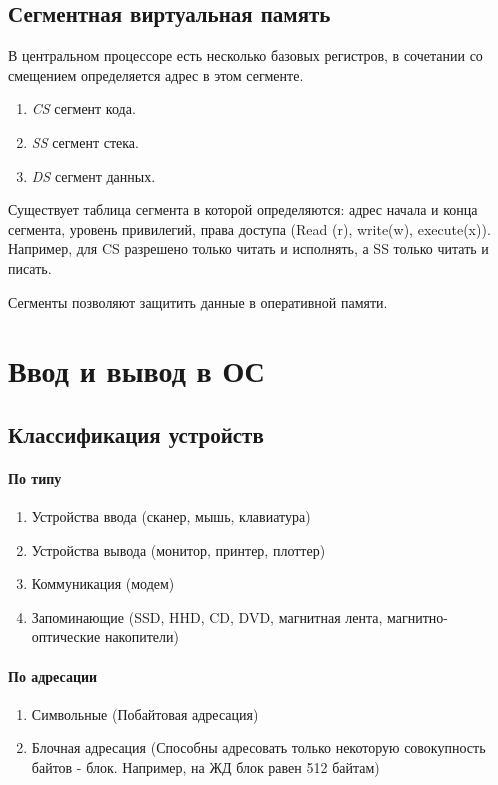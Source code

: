 \documentclass[]{article}
\begin{document}
			\subsection{Сегментная виртуальная память}
			В центральном процессоре есть несколько базовых регистров, в сочетании со смещением определяется адрес в этом сегменте. 
			\begin{enumerate}
				\item \textit{CS} сегмент кода.
				\item \textit{SS} сегмент стека.
				\item \textit{DS} сегмент данных.
			\end{enumerate}
			Существует таблица сегмента в которой определяются: адрес начала и конца сегмента, уровень привилегий, права доступа (Read (r), write(w), execute(x)). Например, для CS разрешено только читать и исполнять, а SS только читать и писать.
			
			Сегменты позволяют защитить данные в оперативной памяти.
		\section{Ввод и вывод в ОС}
			\subsection{Классификация устройств}
			\paragraph{По типу}
			\begin{enumerate}
				\item Устройства ввода (сканер, мышь, клавиатура)
				\item Устройства вывода (монитор, принтер, плоттер)
				\item Коммуникация (модем)
				\item Запоминающие (SSD, HHD, CD, DVD, магнитная лента, магнитно-оптические накопители)
			\end{enumerate}
			\paragraph{По адресации}
			\begin{enumerate}
				\item Символьные (Побайтовая адресация)
				\item Блочная адресация (Способны адресовать только некоторую совокупность байтов - блок. Например, на ЖД блок равен 512 байтам)
			\end{enumerate}
\end{document}
